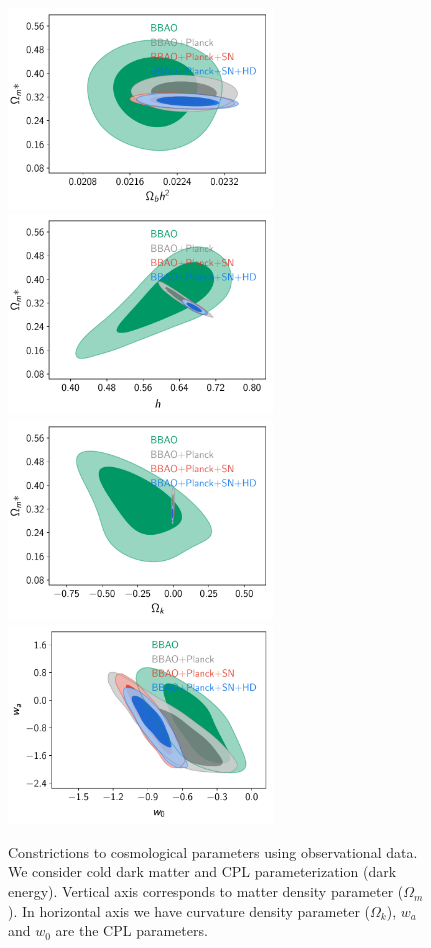 \documentclass[onecolumn,           %
               showpacs,            %
               preprintnumbers,     %
               aps,                 %
               letterpaper,             %
               superscriptaddress,      %
               nofootinbib,         %
               tightenlines,        %
               floats,floatfix      %
               ,usenatbib,
               ]{revtex4-1}
\begin{document}
\begin{figure}[htp]
	\centering
	\includegraphics[width=7cm]{FiguresCosmo/Obh2_Om_owaCDM_todas.pdf}	
	\includegraphics[width=7cm]{FiguresCosmo/h_Om_owaCDM_todas.pdf}
	\includegraphics[width=7cm]{FiguresCosmo/Ok_Om_owaCDM_todas}
	\includegraphics[width=7cm]{FiguresCosmo/w0_wa_owaCDM_todas}
	\caption{Constrictions to cosmological parameters using observational data. We consider cold dark matter and CPL parameterization (dark energy). Vertical axis corresponds to matter density parameter ($\Omega_m$). In horizontal axis we have curvature density parameter ($\Omega_k$), $w_a$ and $w_0$ are the CPL parameters.}
	\label{cosmo1}
\end{figure}
\end{document}
